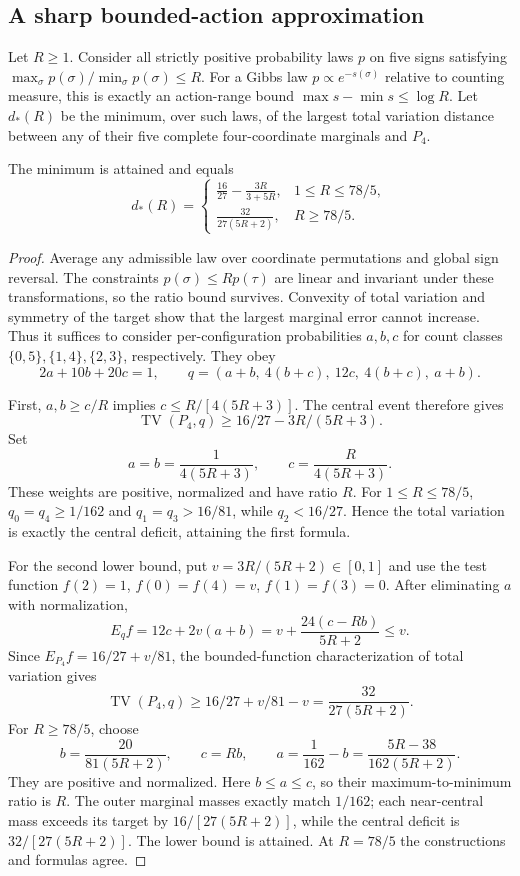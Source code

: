 \subsection{A sharp bounded-action approximation}
\label{fin:bounded-action}

Let \(R\ge1\).  Consider all strictly positive probability laws \(p\)
on five signs satisfying
\(\max_\sigma p(\sigma)/\min_\sigma p(\sigma)\le R\).
For a Gibbs law \(p\propto e^{-s(\sigma)}\) relative to counting measure,
this is exactly an action-range bound
\(\max s-\min s\le\log R\).
Let \(d_*(R)\) be the minimum, over such laws, of the largest total
variation distance between any of their five complete four-coordinate
marginals and \(P_4\).

\begin{theorem}\label{fin:range-theorem}
The minimum is attained and equals
\[
 d_*(R)=
 \begin{cases}
 \displaystyle\frac{16}{27}-\frac{3R}{3+5R},
                       &1\le R\le78/5,\\[6pt]
 \displaystyle\frac{32}{27(5R+2)},&R\ge78/5 .
 \end{cases}
\]
\end{theorem}
\begin{proof}
Average any admissible law over coordinate permutations and global
sign reversal.  The constraints \(p(\sigma)\le R p(\tau)\) are linear
and invariant under these transformations, so the ratio bound
survives.  Convexity of total variation and symmetry of the target
show that the largest marginal error cannot increase.
Thus it suffices to consider per-configuration probabilities \(a,b,c\)
for count classes \(\{0,5\},\{1,4\},\{2,3\}\), respectively.
They obey
\[
 2a+10b+20c=1,\qquad
 q=(a+b,\ 4(b+c),\ 12c,\ 4(b+c),\ a+b).
\]

First, \(a,b\ge c/R\) implies
\(c\le R/[4(5R+3)]\).  The central event therefore gives
\[
 \operatorname{TV}(P_4,q)\ge16/27-3R/(5R+3).
\]
Set
\[
 a=b=\frac1{4(5R+3)},\qquad c=\frac{R}{4(5R+3)}.
\]
These weights are positive, normalized and have ratio \(R\).
For \(1\le R\le78/5\), \(q_0=q_4\ge1/162\) and
\(q_1=q_3>16/81\), while \(q_2<16/27\).
Hence the total variation is exactly the central deficit, attaining
the first formula.

For the second lower bound, put \(v=3R/(5R+2)\in[0,1]\) and use
the test function \(f(2)=1\), \(f(0)=f(4)=v\), \(f(1)=f(3)=0\).
After eliminating \(a\) with normalization,
\[
 E_qf=12c+2v(a+b)
     =v+\frac{24(c-Rb)}{5R+2}\le v.
\]
Since \(E_{P_4}f=16/27+v/81\), the bounded-function characterization
of total variation gives
\[
 \operatorname{TV}(P_4,q)\ge16/27+v/81-v
                          =\frac{32}{27(5R+2)}.
\]
For \(R\ge78/5\), choose
\[
 b=\frac{20}{81(5R+2)},\qquad
 c=Rb,\qquad
 a=\frac1{162}-b=\frac{5R-38}{162(5R+2)}.
\]
They are positive and normalized.  Here \(b\le a\le c\), so their
maximum-to-minimum ratio is \(R\).
The outer marginal masses exactly match \(1/162\);
each near-central mass exceeds its target by
\(16/[27(5R+2)]\), while the central deficit is
\(32/[27(5R+2)]\).  The lower bound is attained.
At \(R=78/5\) the constructions and formulas agree.
\end{proof}

